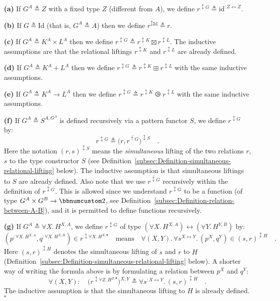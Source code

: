 \textbf{(a)} If $G^{A}\triangleq Z$ with a fixed type $Z$ (different
from $A$), we define $r^{\updownarrow G}\triangleq\text{id}^{:Z\leftrightarrow Z}$.

\textbf{(b)} If $G\triangleq\text{Id}$ (that is, $G^{A}\triangleq A$)
then we define $r^{\updownarrow\text{Id}}\triangleq r$. 

\textbf{(c)} If $G^{A}\triangleq K^{A}\times L^{A}$ then we define
$r^{\updownarrow G}\triangleq r^{\updownarrow K}\boxtimes r^{\updownarrow L}$.
The inductive assumptions are that the relational liftings $r^{\updownarrow K}$
and $r^{\updownarrow L}$ are already defined.

\textbf{(d)} If $G^{A}\triangleq K^{A}+L^{A}$ then we define $r^{\updownarrow G}\triangleq r^{\updownarrow K}\boxplus r^{\updownarrow L}$
with the same inductive assumptions.

\textbf{(e)} If $G^{A}\triangleq K^{A}\rightarrow L^{A}$ then we
define $r^{\updownarrow G}\triangleq r^{\updownarrow K}\ogreaterthan r^{\updownarrow L}$
with the same inductive assumptions.

\textbf{(f)} If $G^{A}\triangleq S^{A,G^{A}}$ is defined recursively
via a pattern functor $S$, we define $r^{\updownarrow G}$ by:
\[
r^{\updownarrow G}\triangleq\big(r,\overline{r^{\uparrow G}}\big)^{\updownarrow S}\quad.
\]
Here the notation $(r,s)^{\updownarrow S}$ means the \emph{simultaneous}
lifting of the two relations $r$, $s$ to the type constructor $S$
(see Definition~\ref{subsec:Definition-simultaneous-relational-lifting}
below). The inductive assumption is that simultaneous liftings to
$S$ are already defined. Also note that we use $\overline{r^{\updownarrow G}}$
recursively within the definition of $r^{\updownarrow G}$. This is
allowed since we understand $r^{\updownarrow G}$ to be a function
(of type $G^{A}\times G^{B}\rightarrow\bbnum 2$, see Definition~\ref{subsec:Definition-relation-between-A-B}),
and it is permitted to define functions recursively. 

\textbf{(g)} If $G^{A}\triangleq\forall X.\,H^{X,A}$, we define $r^{\updownarrow G}$
of type $(\forall X.\,H^{X,A})\leftrightarrow(\forall Y.\,H^{Y,B})$
by:
\[
(p^{:\forall X.\,H^{X,A}},q^{:\forall X.\,H^{X,B}})\in r^{\updownarrow\forall X.\,H^{X,\bullet}}\quad\text{means}\quad\forall(X,Y).\,\forall s^{X\leftrightarrow Y}.\,(p^{X},q^{Y})\in(s,r)^{\updownarrow H}\quad.
\]
Here $(s,r)^{\updownarrow H}$ denotes the simultaneous lifting of
$s$ and $r$ to $H$ (Definition~\ref{subsec:Definition-simultaneous-relational-lifting}
below). A shorter way of writing the formula above is by formulating
a relation between $p^{X}$ and $q^{Y}$:
\begin{equation}
\forall(X,Y):\quad\big(r^{\updownarrow\forall Z.\,H^{Z,\bullet}}\big)^{X,Y}\triangleq\forall s^{:X\leftrightarrow Y}.\,(s,r)^{\updownarrow H}\quad.\label{eq:relational-lifting-quantified-types-short}
\end{equation}
The inductive assumption is that the simultaneous lifting to $H$
is already defined. $\square$

